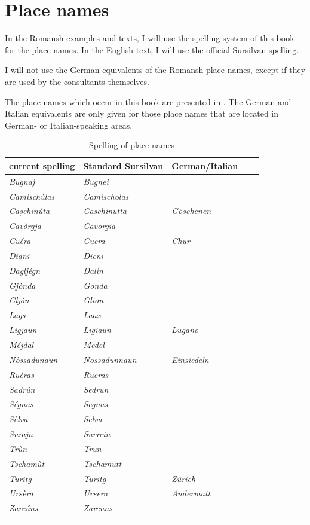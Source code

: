 \section{Place names}
In the Romansh examples and texts, I will use the spelling system of this book for the place names. In the English text, I will use the official Sursilvan spelling.

I will not use the German equivalents of the Romansh place names, except if they are used by the consultants themselves.

The place names which occur in this book are presented in . The German and Italian equivalents are only given for those place names that are located in German- or Italian-speaking areas.

\begin{table}
	\caption{Spelling of place names}
	\label{spellpln}
	\begin{tabular}{lllll}
\lsptoprule
current spelling &  Standard Sursilvan & German/Italian\\
\midrule
\textit{Bugnaj} & \textit{Bugnei}\\
\textit{Camischùlas} & \textit{Camischolas}\\
\textit{Caṣchinùta} & \textit{Caschinutta} & \textit{Göschenen}\\
\textit{Cavòrgja} & \textit{Cavorgia}\\
\textit{Cuéra} & \textit{Cuera} & \textit{Chur}\\
\textit{Diani} & \textit{Dieni}\\
\textit{Dagljégn} & \textit{Dalin}\\
\textit{Gjònda} & \textit{Gonda}\\
\textit{Gljòn} & \textit{Glion}\\
\textit{Lags} & \textit{Laax}\\
\textit{Ligjaun} & \textit{Ligiaun} & \textit{Lugano}\\
\textit{Méjdal} & \textit{Medel}\\
\textit{Nòssadunaun} & \textit{Nossadunnaun} & \textit{Einsiedeln}\\
\textit{Ruèras} & \textit{Rueras}\\
\textit{Sadrún} & \textit{Sedrun}\\
\textit{Ségnas} & \textit{Segnas}\\
\textit{Sèlva} & \textit{Selva}\\
\textit{Surajn} & \textit{Surrein}\\
\textit{Trùn} & \textit{Trun}\\
\textit{Tschamùt} & \textit{Tschamutt}\\
\textit{Turitg} & \textit{Turitg} & \textit{Zürich}\\
\textit{Ursèra} & \textit{Ursera} & \textit{Andermatt}\\
\textit{Zarcúns} & \textit{Zarcuns}\\
\lspbottomrule
\end{tabular}
\end{table}

